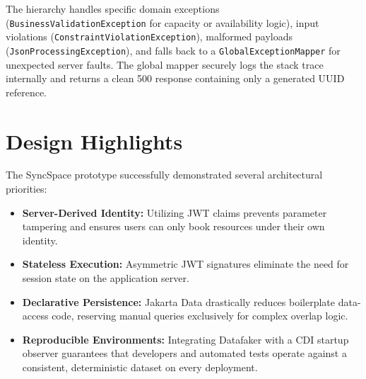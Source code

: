 The hierarchy handles specific domain exceptions (\texttt{BusinessValidationException}
for capacity or availability logic), input violations (\texttt{ConstraintViolationException}),
malformed payloads (\texttt{JsonProcessingException}), and falls back to a
\texttt{GlobalExceptionMapper} for unexpected server faults. The global
mapper securely logs the stack trace internally and returns a clean 500
response containing only a generated UUID reference.

\section{Design Highlights}
\label{app:syncspace-highlights}

The SyncSpace prototype successfully demonstrated several architectural priorities:
\begin{itemize}
	\item \textbf{Server-Derived Identity:} Utilizing \ac{JWT} claims prevents
		parameter tampering and ensures users can only book resources under their
		own identity.

	\item \textbf{Stateless Execution:} Asymmetric \ac{JWT} signatures eliminate
		the need for session state on the application server.

	\item \textbf{Declarative Persistence:} Jakarta Data drastically reduces
		boilerplate data-access code, reserving manual queries exclusively for complex
		overlap logic.

	\item \textbf{Reproducible Environments:} Integrating Datafaker with a
		CDI startup observer guarantees that developers and automated tests
		operate against a consistent, deterministic dataset on every deployment.
\end{itemize}